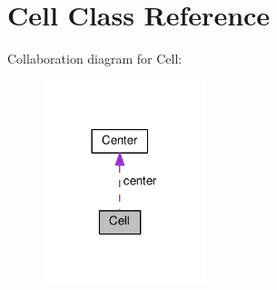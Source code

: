 \hypertarget{class_cell}{}\section{Cell Class Reference}
\label{class_cell}


Collaboration diagram for Cell\+:
\nopagebreak
\begin{figure}[H]
\begin{center}
\leavevmode
\includegraphics[width=134pt]{class_cell__coll__graph}
\end{center}
\end{figure}
